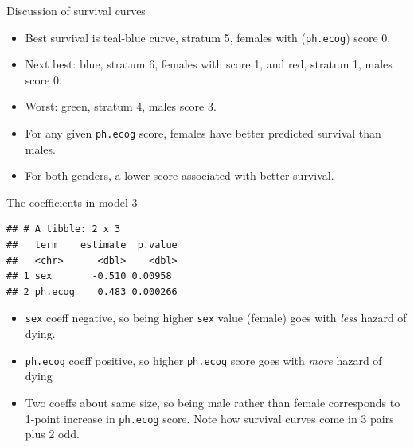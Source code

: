\documentclass[
  ignorenonframetext,
]{beamer}
\newenvironment{Shaded}{\begin{snugshade}}{\end{snugshade}}
\newcommand{\FloatTok}[1]{\textcolor[rgb]{0.00,0.00,0.81}{#1}}
\newcommand{\KeywordTok}[1]{\textcolor[rgb]{0.13,0.29,0.53}{\textbf{#1}}}
\newcommand{\NormalTok}[1]{#1}
\newcommand{\OperatorTok}[1]{\textcolor[rgb]{0.81,0.36,0.00}{\textbf{#1}}}
\newcommand{\StringTok}[1]{\textcolor[rgb]{0.31,0.60,0.02}{#1}}
\begin{document}
\begin{frame}[fragile]{Discussion of survival curves}
\protect\hypertarget{discussion-of-survival-curves}{}

\begin{itemize}
\item
  Best survival is teal-blue curve, stratum 5, females with
  (\texttt{ph.ecog}) score 0.
\item
  Next best: blue, stratum 6, females with score 1, and red, stratum 1,
  males score 0.
\item
  Worst: green, stratum 4, males score 3.
\item
  For any given \texttt{ph.ecog} score, females have better predicted
  survival than males.
\item
  For both genders, a lower score associated with better survival.
\end{itemize}

\end{frame}

\begin{frame}[fragile]{The coefficients in model 3}
\protect\hypertarget{the-coefficients-in-model-3}{}

\begin{Shaded}
\end{Shaded}

\begin{verbatim}
## # A tibble: 2 x 3
##   term    estimate  p.value
##   <chr>      <dbl>    <dbl>
## 1 sex       -0.510 0.00958 
## 2 ph.ecog    0.483 0.000266
\end{verbatim}

\begin{itemize}
\item
  \texttt{sex} coeff negative, so being higher \texttt{sex} value
  (female) goes with \emph{less} hazard of dying.
\item
  \texttt{ph.ecog} coeff positive, so higher \texttt{ph.ecog} score goes
  with \emph{more} hazard of dying
\item
  Two coeffs about same size, so being male rather than female
  corresponds to 1-point increase in \texttt{ph.ecog} score. Note how
  survival curves come in 3 pairs plus 2 odd.
\end{itemize}

\end{frame}
\end{document}

